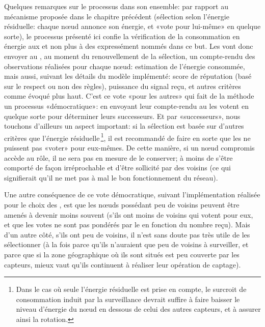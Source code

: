Quelques remarques sur le processus dans son ensemble: par rapport au mécanisme proposée dans le chapitre précédent (sélection selon l'énergie résiduelle: chaque nœud annonce son énergie, et «vote pour lui-même» en quelque sorte), le processus présenté ici confie la vérification de la consommation en énergie aux \cns et non plus à des \vns expressément nommés dans ce but.
Les \cns vont donc envoyer au \ch, au moment du renouvellement de la sélection, un compte-rendu des observations réalisées pour chaque nœud: estimation de l'énergie consommée, mais aussi, suivant les détails du modèle implémenté: score de réputation (basé sur le respect ou non des règles), puissance du signal reçu, et autres critères comme évoqué plus haut.
C'est ce vote «pour les autres» qui fait de la méthode un processus «démocratique»: en envoyant leur compte-rendu au \CH les \cns votent en quelque sorte pour déterminer leurs successeurs.
Et par «successeurs», nous touchons d'ailleurs un aspect important: si la sélection est basée sur d'autres critères que l'énergie résiduelle\,\footnote{Dans le cas où seule l'énergie résiduelle est prise en compte, le surcroit de consommation induit par la surveillance devrait suffire à faire baisser le niveau d'énergie du nœud en dessous de celui des autres capteurs, et à assurer ainsi la rotation.}, il est recommandé de faire en sorte que les \cns ne puissent pas «voter» pour eux-mêmes.
De cette manière, si un nœud compromis accède au rôle, il ne sera pas en mesure de le conserver; à moins de s'être comporté de façon irréprochable et d'être sollicité par des \cns voisins (ce qui signifierait qu'il ne met pas à mal le bon fonctionnement du réseau).

Une autre conséquence de ce vote démocratique, suivant l'implémentation réalisée pour le choix des \cns, est que les nœuds possédant peu de voisins peuvent être amenés à devenir moins souvent \cns (s'ils ont moins de \cns voisins qui votent pour eux, et que les votes ne sont pas pondérés par le \ch en fonction du nombre reçu).
Mais d'un autre côté, s'ils ont peu de voisins, il n'est sans doute pas très utile de les sélectionner (à la fois parce qu'ils n'auraient que peu de voisins à surveiller, et parce que si la zone géographique où ils sont situés est peu couverte par les capteurs, mieux vaut qu'ils continuent à réaliser leur opération de captage).
